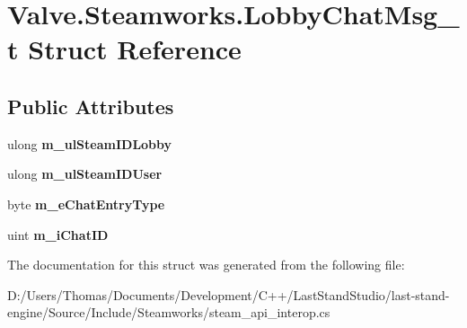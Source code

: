 \hypertarget{structValve_1_1Steamworks_1_1LobbyChatMsg__t}{}\section{Valve.\+Steamworks.\+Lobby\+Chat\+Msg\+\_\+t Struct Reference}
\label{structValve_1_1Steamworks_1_1LobbyChatMsg__t}
\subsection*{Public Attributes}
\begin{DoxyCompactItemize}
\item 
\hypertarget{structValve_1_1Steamworks_1_1LobbyChatMsg__t_ad1a642d16cc0ec2cd99cf8ad63ecf65a}{}ulong {\bfseries m\+\_\+ul\+Steam\+I\+D\+Lobby}\label{structValve_1_1Steamworks_1_1LobbyChatMsg__t_ad1a642d16cc0ec2cd99cf8ad63ecf65a}

\item 
\hypertarget{structValve_1_1Steamworks_1_1LobbyChatMsg__t_a40aad7eb0f11ec877a0ec9448df73960}{}ulong {\bfseries m\+\_\+ul\+Steam\+I\+D\+User}\label{structValve_1_1Steamworks_1_1LobbyChatMsg__t_a40aad7eb0f11ec877a0ec9448df73960}

\item 
\hypertarget{structValve_1_1Steamworks_1_1LobbyChatMsg__t_a9f2f810bac5672e03368a265de2afc18}{}byte {\bfseries m\+\_\+e\+Chat\+Entry\+Type}\label{structValve_1_1Steamworks_1_1LobbyChatMsg__t_a9f2f810bac5672e03368a265de2afc18}

\item 
\hypertarget{structValve_1_1Steamworks_1_1LobbyChatMsg__t_a8a7a47e34940cd9836e6354bb591002d}{}uint {\bfseries m\+\_\+i\+Chat\+I\+D}\label{structValve_1_1Steamworks_1_1LobbyChatMsg__t_a8a7a47e34940cd9836e6354bb591002d}

\end{DoxyCompactItemize}


The documentation for this struct was generated from the following file\+:\begin{DoxyCompactItemize}
\item 
D\+:/\+Users/\+Thomas/\+Documents/\+Development/\+C++/\+Last\+Stand\+Studio/last-\/stand-\/engine/\+Source/\+Include/\+Steamworks/steam\+\_\+api\+\_\+interop.\+cs\end{DoxyCompactItemize}
